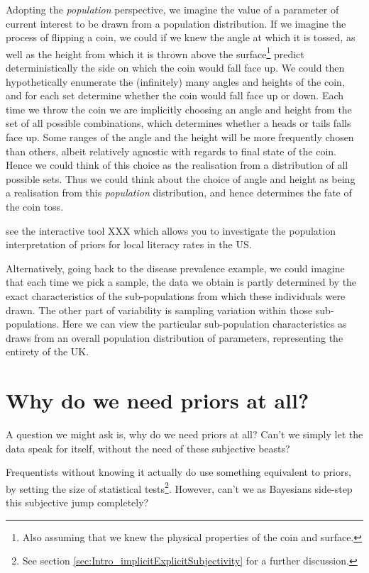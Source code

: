 \documentclass[11pt,fullpage]{book}
\begin{document}
Adopting the \textit{population} perspective, we imagine the value of a parameter of current interest to be drawn from a population distribution. If we imagine the process of flipping a coin, we could if we knew the angle at which it is tossed, as well as the height from which it is thrown above the surface\footnote{Also assuming that we knew the physical properties of the coin and surface.} predict deterministically the side on which the coin would fall face up. We could then hypothetically enumerate the (infinitely) many angles and heights of the coin, and for each set determine whether the coin would fall face up or down. Each time we throw the coin we are implicitly choosing an angle and height from the set of all possible combinations, which determines whether a heads or tails falls face up. Some ranges of the angle and the height will be more frequently chosen than others, albeit relatively agnostic with regards to final state of the coin.  Hence we could think of this choice as the realisation from a distribution of all possible sets. Thus we could think about the choice of angle and height as being a realisation from this \textit{population} distribution, and hence determines the fate of the coin toss.

 see the interactive tool XXX which allows you to investigate the population interpretation of priors for local literacy rates in the US. 

Alternatively, going back to the disease prevalence example, we could imagine that each time we pick a sample, the data we obtain is partly determined by the exact characteristics of the sub-populations from which these individuals were drawn. The other part of variability is sampling variation within those sub-populations. Here we can view the particular sub-population characteristics as draws from an overall population distribution of parameters, representing the entirety of the UK. 

\section{Why do we need priors at all?}
A question we might ask is, why do we need priors at all? Can't we simply let the data speak for itself, without the need of these subjective beasts? 

Frequentists without knowing it actually do use something equivalent to priors, by setting the size of statistical tests\footnote{See section \ref{sec:Intro_implicitExplicitSubjectivity} for a further discussion.}. However, can't we as Bayesians side-step this subjective jump completely?
\end{document}
